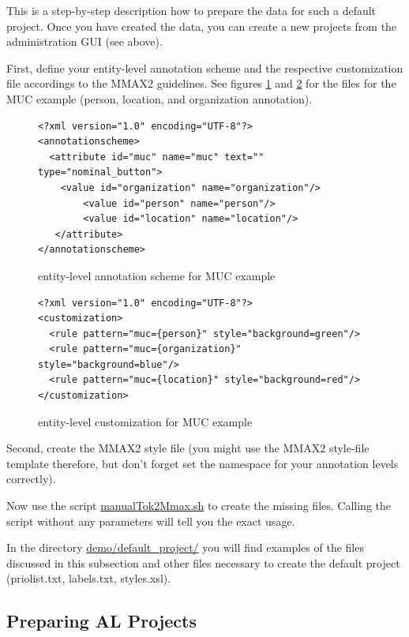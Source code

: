 \documentclass[DIV12,english,11pt,halfparskip]{scrartcl}
\begin{document}
\begin{appendix}
This is a step-by-step description how to prepare the data for such a
default project. Once you have created the data, you can create a new
projects from the administration GUI (see above). 

First, define your entity-level annotation scheme and the respective
customization file accordings to the MMAX2 guidelines. See figures
\ref{fig:muc_schema} and \ref{fig:muc_cust} for the files for the MUC
example (person, location, and organization annotation).

\begin{figure}[h]
\begin{verbatim}
<?xml version="1.0" encoding="UTF-8"?>
<annotationscheme>
  <attribute id="muc" name="muc" text="" type="nominal_button">
    <value id="organization" name="organization"/>
        <value id="person" name="person"/>
        <value id="location" name="location"/>
   </attribute>
</annotationscheme>
\end{verbatim}
\label{fig:muc_schema}
\caption{entity-level annotation scheme for MUC example}
\end{figure}

\begin{figure}[h]
\begin{verbatim}
<?xml version="1.0" encoding="UTF-8"?>
<customization>
  <rule pattern="muc={person}" style="background=green"/>
  <rule pattern="muc={organization}" style="background=blue"/>
  <rule pattern="muc={location}" style="background=red"/>
</customization>
\end{verbatim}
\label{fig:muc_cust}
\caption{entity-level customization for MUC example}
\end{figure}

Second, create the MMAX2 style file (you might use the MMAX2 style-file
template therefore, but don't forget set the namespace for your
annotation levels correctly).

Now use the script \url{manualTok2Mmax.sh} to create the missing
files. Calling the script without any parameters will tell you the
exact usage.

In the directory \url{demo/default_project/} you will find examples of
the files discussed in this subsection and other files necessary to
create the default project (priolist.txt, labels.txt, styles.xsl).


\subsection{Preparing AL Projects}


\end{appendix}
\end{document}
